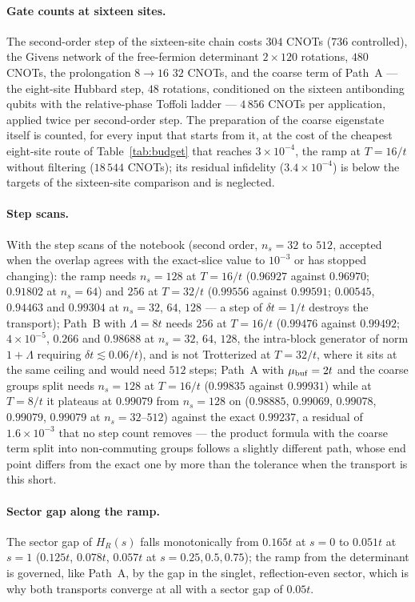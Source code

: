 \documentclass[a4paper,11pt,noarxiv]{quantumarticle}
\begin{document}
\paragraph{Gate counts at sixteen sites.}
The second-order step of the sixteen-site chain costs $304$ CNOTs ($736$
controlled), the Givens network of the free-fermion determinant
$2\times120$ rotations, $480$ CNOTs, the prolongation $8\to16$ $32$ CNOTs,
and the coarse term of Path~A --- the eight-site Hubbard step, $48$
rotations, conditioned on the sixteen antibonding qubits with the
relative-phase Toffoli ladder --- $4\,856$ CNOTs per application, applied
twice per second-order step.  The preparation of the coarse eigenstate
itself is counted, for every input that starts from it, at the cost of the
cheapest eight-site route of Table~\ref{tab:budget} that reaches
$3\times10^{-4}$, the ramp at $T=16/t$ without filtering ($18\,544$ CNOTs);
its residual infidelity ($3.4\times10^{-4}$) is below the targets of the
sixteen-site comparison and is neglected.

\paragraph{Step scans.}
With the step scans of the notebook (second order, $n_s=32$ to $512$,
accepted when the overlap agrees with the exact-slice value to $10^{-3}$ or
has stopped changing): the ramp needs $n_s=128$ at $T=16/t$ ($0.96927$
against $0.96970$; $0.91802$ at $n_s=64$) and $256$ at $T=32/t$ ($0.99556$
against $0.99591$; $0.00545$, $0.94463$ and $0.99304$ at $n_s=32$, $64$,
$128$ --- a step of $\delta t=1/t$ destroys the transport); Path~B with
$\Lambda=8t$ needs $256$ at $T=16/t$ ($0.99476$ against $0.99492$;
$4\times10^{-5}$, $0.266$ and $0.98688$ at $n_s=32$, $64$, $128$, the
intra-block generator of norm $1+\Lambda$ requiring $\delta t\lesssim0.06/t$),
and is not Trotterized at $T=32/t$, where it sits at the same ceiling and
would need $512$ steps; Path~A with $\mu_{\rm buf}=2t$ and the
coarse groups split needs $n_s=128$ at $T=16/t$ ($0.99835$ against
$0.99931$) while at $T=8/t$ it plateaus at $0.99079$ from $n_s=128$ on
($0.98885$, $0.99069$, $0.99078$, $0.99079$, $0.99079$ at
$n_s=32$--$512$) against the exact $0.99237$, a residual of
$1.6\times10^{-3}$ that no step count removes --- the product formula with
the coarse term split into non-commuting groups follows a slightly different
path, whose end point differs from the exact one by more than the tolerance
when the transport is this short.

\paragraph{Sector gap along the ramp.}
The sector gap of $H_R(s)$ falls monotonically from $0.165t$ at $s=0$ to
$0.051t$ at $s=1$ ($0.125t$, $0.078t$, $0.057t$ at $s=0.25,0.5,0.75$); the
ramp from the determinant is governed, like Path~A, by the gap in the
singlet, reflection-even sector, which is why both transports converge at
all with a sector gap of $0.05t$.
\end{document}
